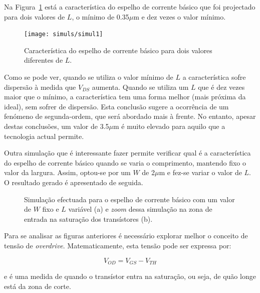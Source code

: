 \documentclass[11pt]{article}
\numberwithin{equation}{section}
\begin{document}
Na Figura~\ref{fig:simul1} está a característica do espelho de corrente básico que foi projectado para dois valores de $L$, o mínimo de 0.35$\mu$m e dez vezes o valor mínimo.

\begin{figure}[H]
	\centering
	\texttt{[image: simuls/simul1]}
	\vspace{-0.8em}
	\caption{Característica do espelho de corrente básico para dois valores diferentes de $L$.}
	\vspace{-0.8em}
	\label{fig:simul1}
\end{figure} 

Como se pode ver, quando se utiliza o valor mínimo de $L$ a característica sofre dispersão à medida que $V_{DS}$ aumenta. Quando se utiliza um $L$ que é dez vezes maior que o mínimo, a característica tem uma forma melhor (mais próxima da ideal), sem sofrer de dispersão. Esta conclusão sugere a ocorrência de um fenómeno de segunda-ordem, que será abordado mais à frente. No entanto, apesar destas conclusões, um valor de 3.5$\mu$m é muito elevado para aquilo que a tecnologia actual permite. 

Outra simulação que é interessante fazer permite verificar qual é a característica do espelho de corrente básico quando se varia o comprimento, mantendo fixo o valor da largura. Assim, optou-se por um $W$ de 2$\mu$m e fez-se variar o valor de $L$. O resultado gerado é apresentado de seguida.

\begin{figure}[H]
	\centering
	\linebreak
	\vspace{-0.8em}
	\caption{Simulação efectuada para o espelho de corrente básico com um valor de $W$ fixo e $L$ variável (a) e \textit{zoom} dessa simulação na zona de entrada na saturação dos transístores (b).}
	\vspace{-0.8em}
\end{figure}

Para se analisar as figuras anteriores é necessário explorar melhor o conceito de tensão de \textit{overdrive}. Matematicamente, esta tensão pode ser expressa por:

\vspace{-3mm}
\begin{equation}
V_{OD} = V_{GS}-V_{TH}
\end{equation}

\vspace{1mm}
e é uma medida de quando o transístor entra na saturação, ou seja, de quão longe está da zona de corte.
\end{document}
